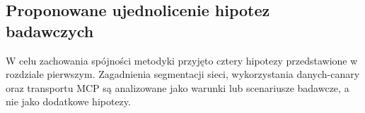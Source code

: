 
\subsection{Proponowane ujednolicenie hipotez badawczych}
\label{subsec:hipotezy-propozycja}

W celu zachowania spójności metodyki przyjęto cztery hipotezy przedstawione
w rozdziale pierwszym. Zagadnienia segmentacji sieci, wykorzystania danych-canary
oraz transportu MCP są analizowane jako warunki lub scenariusze badawcze, a nie
jako dodatkowe hipotezy.

